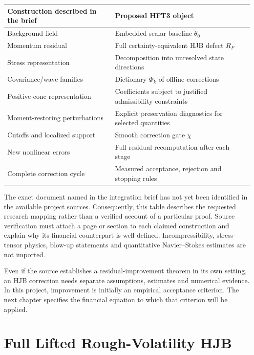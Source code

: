 \begin{center}\small
\begin{tabularx}{\textwidth}{@{}p{}X@{}}
\toprule
Construction described in the brief & Proposed HFT3 object \\
\midrule
Background field & Embedded scalar baseline $\widetilde\theta_0$ \\
Momentum residual & Full certainty-equivalent HJB defect $R_F$ \\
Stress representation & Decomposition into unresolved state directions \\
Covariance/wave families & Dictionary $\Phi_k$ of offline corrections \\
Positive-cone representation & Coefficients subject to justified admissibility constraints \\
Moment-restoring perturbations & Explicit preservation diagnostics for selected quantities \\
Cutoffs and localized support & Smooth correction gate $\chi$ \\
New nonlinear errors & Full residual recomputation after each stage \\
Complete correction cycle & Measured acceptance, rejection and stopping rules \\
\bottomrule
\end{tabularx}\end{center}

The exact document named in the integration brief has not yet been identified in the available project sources. Consequently, this table describes the requested research mapping rather than a verified account of a particular proof. Source verification must attach a page or section to each claimed construction and explain why its financial counterpart is well defined. Incompressibility, stress-tensor physics, blow-up statements and quantitative Navier--Stokes estimates are not imported.

Even if the source establishes a residual-improvement theorem in its own setting, an HJB correction needs separate assumptions, estimates and numerical evidence. In this project, improvement is initially an empirical acceptance criterion. The next chapter specifies the financial equation to which that criterion will be applied.

\chapter{Full Lifted Rough-Volatility HJB}

